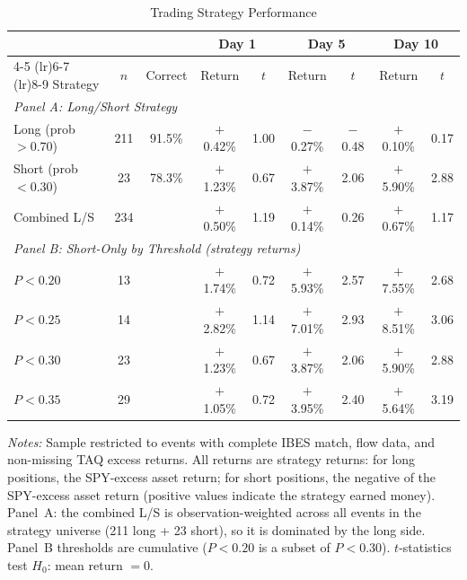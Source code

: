 \documentclass[11pt]{article}
\begin{document}
\begin{table}[htbp]
\centering
\begin{threeparttable}
\caption{Trading Strategy Performance}
\label{tab:strategies}
\begin{tabular}{lcccccccc}
\toprule
& & & \multicolumn{2}{c}{Day 1} & \multicolumn{2}{c}{Day 5} & \multicolumn{2}{c}{Day 10} \\
\cmidrule(lr){4-5} \cmidrule(lr){6-7} \cmidrule(lr){8-9}
Strategy & $n$ & Correct & Return & $t$ & Return & $t$ & Return & $t$ \\
\midrule
\multicolumn{9}{l}{\textit{Panel A: Long/Short Strategy}} \\
Long (prob $> 0.70$) & 211 & 91.5\% & $+$0.42\% & 1.00 & $-$0.27\% & $-$0.48 & $+$0.10\% & 0.17 \\
Short (prob $< 0.30$) & 23 & 78.3\% & $+$1.23\% & 0.67 & $+$3.87\% & 2.06 & $+$5.90\% & 2.88 \\
Combined L/S & 234 & & $+$0.50\% & 1.19 & $+$0.14\% & 0.26 & $+$0.67\% & 1.17 \\
\midrule
\multicolumn{9}{l}{\textit{Panel B: Short-Only by Threshold (strategy returns)}} \\
$P < 0.20$ & 13 & & $+$1.74\% & 0.72 & $+$5.93\% & 2.57 & $+$7.55\% & 2.68 \\
$P < 0.25$ & 14 & & $+$2.82\% & 1.14 & $+$7.01\% & 2.93 & $+$8.51\% & 3.06 \\
$P < 0.30$ & 23 & & $+$1.23\% & 0.67 & $+$3.87\% & 2.06 & $+$5.90\% & 2.88 \\
$P < 0.35$ & 29 & & $+$1.05\% & 0.72 & $+$3.95\% & 2.40 & $+$5.64\% & 3.19 \\
\bottomrule
\end{tabular}
\begin{tablenotes}
\small
\item \textit{Notes:} Sample restricted to events with complete IBES match, flow data, and non-missing TAQ excess returns. All returns are strategy returns: for long positions, the SPY-excess asset return; for short positions, the negative of the SPY-excess asset return (positive values indicate the strategy earned money). Panel~A: the combined L/S is observation-weighted across all events in the strategy universe (211 long + 23 short), so it is dominated by the long side. Panel~B thresholds are cumulative ($P < 0.20$ is a subset of $P < 0.30$). $t$-statistics test $H_0$: mean return $= 0$.
\end{tablenotes}
\end{threeparttable}
\end{table}
\end{document}
